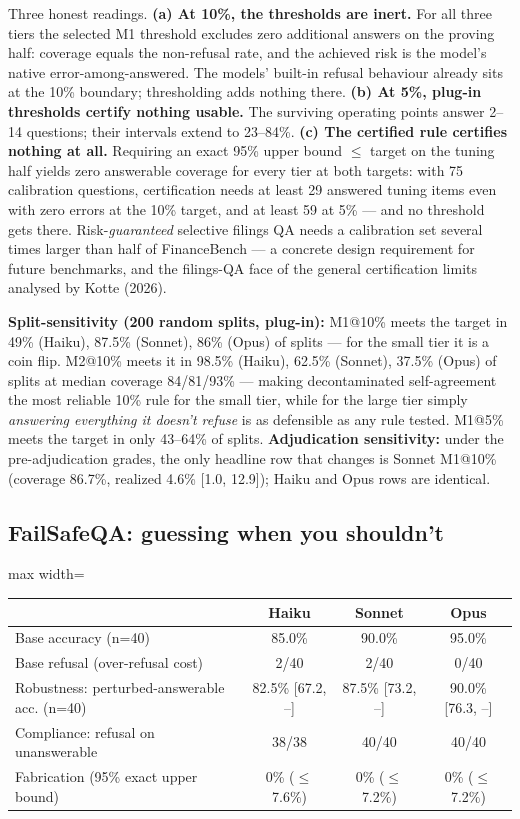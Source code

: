 \documentclass[11pt]{article}
\begin{document}
Three honest readings. \textbf{(a) At 10\%, the thresholds are inert.} For all three tiers the selected M1 threshold excludes zero additional answers on the proving half: coverage equals the non-refusal rate, and the achieved risk is the model's native error-among-answered. The models' built-in refusal behaviour already sits at the 10\% boundary; thresholding adds nothing there. \textbf{(b) At 5\%, plug-in thresholds certify nothing usable.} The surviving operating points answer 2--14 questions; their intervals extend to 23--84\%. \textbf{(c) The certified rule certifies nothing at all.} Requiring an exact 95\% upper bound $\leq$ target on the tuning half yields zero answerable coverage for every tier at both targets: with 75 calibration questions, certification needs at least 29 answered tuning items even with zero errors at the 10\% target, and at least 59 at 5\% --- and no threshold gets there. Risk-\emph{guaranteed} selective filings QA needs a calibration set several times larger than half of FinanceBench --- a concrete design requirement for future benchmarks, and the filings-QA face of the general certification limits analysed by Kotte (2026).

\textbf{Split-sensitivity (200 random splits, plug-in):} M1@10\% meets the target in 49\% (Haiku), 87.5\% (Sonnet), 86\% (Opus) of splits --- for the small tier it is a coin flip. M2@10\% meets it in 98.5\% (Haiku), 62.5\% (Sonnet), 37.5\% (Opus) of splits at median coverage 84/81/93\% --- making decontaminated self-agreement the most reliable 10\% rule for the small tier, while for the large tier simply \emph{answering everything it doesn't refuse} is as defensible as any rule tested. M1@5\% meets the target in only 43--64\% of splits. \textbf{Adjudication sensitivity:} under the pre-adjudication grades, the only headline row that changes is Sonnet M1@10\% (coverage 86.7\%, realized 4.6\% [1.0, 12.9]); Haiku and Opus rows are identical.


\subsection{FailSafeQA: guessing when you shouldn't}

\begin{center}\small
\begin{adjustbox}{max width=\linewidth}
\begin{tabular}{lccc}
\toprule
 & Haiku & Sonnet & Opus \\
\midrule
Base accuracy (n=40) & 85.0\% & 90.0\% & 95.0\% \\
Base refusal (over-refusal cost) & 2/40 & 2/40 & 0/40 \\
Robustness: perturbed-answerable acc. (n=40) & 82.5\% [67.2, --] & 87.5\% [73.2, --] & 90.0\% [76.3, --] \\
Compliance: refusal on unanswerable & 38/38 & 40/40 & 40/40 \\
Fabrication (95\% exact upper bound) & 0\% ($\leq$7.6\%) & 0\% ($\leq$7.2\%) & 0\% ($\leq$7.2\%) \\
\bottomrule
\end{tabular}
\end{adjustbox}
\end{center}
\end{document}
